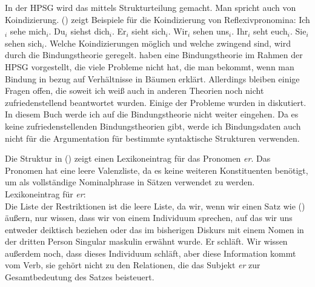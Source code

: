 In der HPSG wird das mittels Strukturteilung gemacht. Man spricht auch von Koindizierung.
() zeigt Beispiele für die Koindizierung von Reflexivpronomina:
\eal
\ex Ich$_i$ sehe mich$_i$.
\ex Du$_i$ siehst dich$_i$.
\ex Er$_i$ sieht sich$_i$.
\ex Wir$_i$ sehen uns$_i$.
\ex Ihr$_i$ seht euch$_i$.
\ex Sie$_i$ sehen sich$_i$.
\zl
Welche Koindizierungen möglich und welche zwingend sind, wird durch die Bindungstheorie
geregelt. \citet{PS92a,ps2} haben eine Bindungstheorie im Rahmen der HPSG vorgestellt, die viele Probleme
nicht hat, die man bekommt, wenn man Bindung in bezug auf Verhältnisse in Bäumen erklärt. Allerdings bleiben
einige Fragen offen, die soweit ich weiß auch in anderen Theorien noch nicht zufriedenstellend beantwortet
wurden. Einige der Probleme wurden in  diskutiert. In diesem Buch werde
ich auf die Bindungstheorie nicht weiter eingehen. Da es keine zufriedenstellenden Bindungstheorien gibt,
werde ich Bindungsdaten auch nicht für die Argumentation für bestimmte syntaktische Strukturen verwenden.

Die Struktur in () zeigt einen Lexikoneintrag für das Pronomen \emph{er}. Das Pronomen hat eine
leere Valenzliste, da es keine weiteren Konstituenten benötigt, um als vollständige Nominalphrase in Sätzen
verwendet zu werden.
\ea
Lexikoneintrag für \emph{er}:\\
\z
Die Liste der Restriktionen ist die leere Liste, da wir, wenn wir einen Satz wie () äußern, nur
wissen, dass wir von einem Individuum sprechen, auf das wir uns entweder deiktisch beziehen oder das
im bisherigen Diskurs mit einem Nomen in der dritten Person Singular maskulin erwähnt wurde.
\ea
Er schläft.
\z
Wir wissen außerdem noch, dass dieses Individuum schläft, aber diese Information kommt vom Verb, sie
gehört nicht zu den Relationen, die das Subjekt \emph{er} zur Gesamtbedeutung des Satzes beisteuert.

